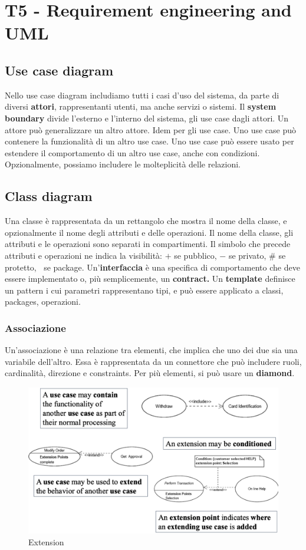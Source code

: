 \documentclass[11pt]{article}
\begin{document}
\section{T5 - Requirement engineering and UML}
\subsection{Use case diagram}
Nello use case diagram includiamo tutti i casi d'uso del sistema, da parte di diversi \textbf{attori}, rappresentanti utenti, ma anche servizi o sistemi. Il \textbf{system boundary} divide l'esterno e l'interno del sistema, gli use case dagli attori. Un attore può generalizzare un altro attore. Idem per gli use case. Uno use case può contenere la funzionalità di un altro use case. Uno use case può essere usato per estendere il comportamento di un altro use case, anche con condizioni. Opzionalmente, possiamo includere le molteplicità delle relazioni. 
\subsection{Class diagram}
Una classe è rappresentata da un rettangolo che mostra il nome della classe, e opzionalmente il nome degli attributi e delle operazioni. Il nome della classe, gli attributi e le operazioni sono separati in compartimenti. Il simbolo che precede attributi e operazioni ne indica la visibilità: $+$ se pubblico, $-$ se privato, $\#$ se protetto, $~$ se package. Un'\textbf{interfaccia} è una specifica di comportamento che deve essere implementato o, più semplicemente, un \textbf{contract.} Un \textbf{template} definisce un pattern i cui parametri rappresentano tipi, e può essere applicato a classi, packages, operazioni. 
\subsubsection{Associazione}
Un'associazione è una relazione tra elementi, che implica che uno dei due sia una variabile dell'altro. Essa è rappresentata da un connettore che può includere ruoli, cardinalità, direzione e \glspl{constraint}. Per più elementi, si può usare un \textbf{diamond}. 
\begin{figure}[H]
    \centering
    \includegraphics[width=0.6\linewidth]{res/teoria/Extension.png}
    \caption{Extension}
\end{figure}
\end{document}
